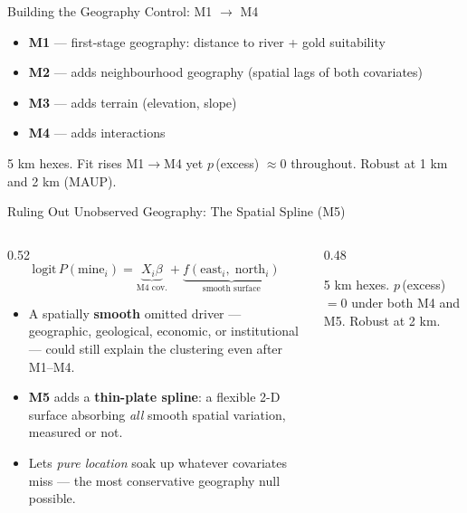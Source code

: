 \documentclass[aspectratio=169,handout]{beamer}
\newcommand{\srcnote}[1]{{\scriptsize\color{galagrey}#1}}
\begin{document}
\begin{frame}{Building the Geography Control: M1 $\to$ M4}
  \begin{itemize}\setlength\itemsep{0.5em}
    \item \textbf{M1} --- first-stage geography: distance to river + gold
          suitability
    \item \textbf{M2} --- adds neighbourhood geography (spatial lags of both
          covariates)
    \item \textbf{M3} --- adds terrain (elevation, slope)
    \item \textbf{M4} --- adds interactions
  \end{itemize}
  \medskip
  \begin{center}
  \end{center}
  \srcnote{5 km hexes. Fit rises M1$\to$M4 yet $p$\,(excess) $\approx 0$
  throughout. Robust at 1 km and 2 km (MAUP).}
\end{frame}

\begin{frame}{Ruling Out Unobserved Geography: The Spatial Spline (M5)}
  \begin{columns}[T]
    \begin{column}{0.52\textwidth}
      \[
        \text{logit}\,P(\text{mine}_i) =
          \underbrace{X_i\beta}_{\text{M4 cov.}} +
          \underbrace{f(\text{east}_i,\;\text{north}_i)}_{\text{smooth surface}}
      \]
      \begin{itemize}\setlength\itemsep{0.4em}
        \item A spatially \textbf{smooth} omitted driver --- geographic,
              geological, economic, or institutional --- could still explain
              the clustering even after M1--M4.
        \item \textbf{M5} adds a \textbf{thin-plate spline}: a flexible 2-D
              surface absorbing \emph{all} smooth spatial variation, measured
              or not.
        \item Lets \emph{pure location} soak up whatever covariates miss ---
              the most conservative geography null possible.
      \end{itemize}
    \end{column}
    \begin{column}{0.48\textwidth}
      \begin{center}
      \end{center}
      \srcnote{5 km hexes. $p$\,(excess) $= 0$ under both M4 and M5.
      Robust at 2 km.}
    \end{column}
  \end{columns}
\end{frame}
\end{document}
